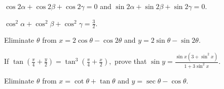   \startitemize[a]
  \item $\cos2\alpha + \cos2\beta + \cos2\gamma = 0$ and $\sin2\alpha + \sin2\beta + \sin2\gamma = 0$.
  \item $\cos^2\alpha + \cos^2\beta + \cos^2\gamma = \frac{3}{2}$.
  \stopitemize
\item Eliminate $\theta$ from $x = 2\cos\theta - \cos2\theta$ and $y = 2\sin\theta - \sin2\theta$.
\item If $\tan\left(\frac{\pi}{4} + \frac{y}{2}\right) = \tan^3\left(\frac{\pi}{4} + \frac{x}{2}\right),$ prove that $\sin y
  = \frac{\sin x(3 + \sin^2x)}{1 + 3\sin^2x}$.
\item Eliminate $\theta$ from $x = \cot\theta + \tan\theta$ and $y = \sec\theta - \cos\theta$.
\stopitemize
